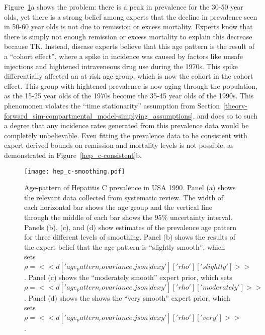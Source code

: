 Figure~\ref{hep_c-data}a shows the problem: there is a peak in
prevalence for the 30-50 year olds, yet there is a strong belief among
experts that the decline in prevalence seen in 50-60 year olds is not
due to remission or excess mortality.  Experts know that there is
simply not enough remission or excess mortality to explain this
decrease because TK.  Instead, disease experts believe that this age
pattern is the result of a ``cohort effect'', where a spike in
incidence was caused by factors like unsafe injections and hightened
intraveneous drug use during the 1970s.  This spike differentially
affected an at-risk age group, which is now the cohort in the cohort
effect.  This group with hightened prevalence is now aging through the
population, as the 15-25 year olds of the 1970s become the 35-45 year
olds of the 1990s.  This phenomonen violates the ``time stationarity''
assumption from
Section~\ref{theory-forward_sim-compartmental_model-simplying_assumptions},
and does so to such a degree that any incidence rates generated from
this prevalence data would be completely unbelievable.  Even fitting
the prevalence data to be consistent with expert derived bounds on
remission and mortality levels is not possible, as demonstrated in
Figure~\ref{hep_c-consistent}b.
\begin{figure}
\begin{center}
\texttt{[image: hep\_c-smoothing.pdf]}
\end{center}
\caption{Age-pattern of Hepatitis C prevalence in USA 1990.  Panel (a)
  shows the relevant data collected from systematic review. The width
  of each horizontal bar shows the age group and the vertical line
  through the middle of each bar shows the $95\%$ uncertainty
  interval.  Panels (b), (c), and (d) show estimates of the prevalence
  age pattern for three different levels of smoothing.  Panel (b)
  shows the results of the expert belief that the age pattern is
  ``slightly smooth'', which sets
  $\rho=<<d['age_pattern_covariance.json|dexy']['rho']['slightly']>>$.  Panel (c)
  shows the ``moderately smooth'' expert prior, which sets
  $\rho=<<d['age_pattern_covariance.json|dexy']['rho']['moderately']>>$.  Panel (d)
  shows the shows the ``very smooth'' expert prior, which sets
  $\rho=<<d['age_pattern_covariance.json|dexy']['rho']['very']>>$.}
\label{hep_c-data}
\end{figure}

